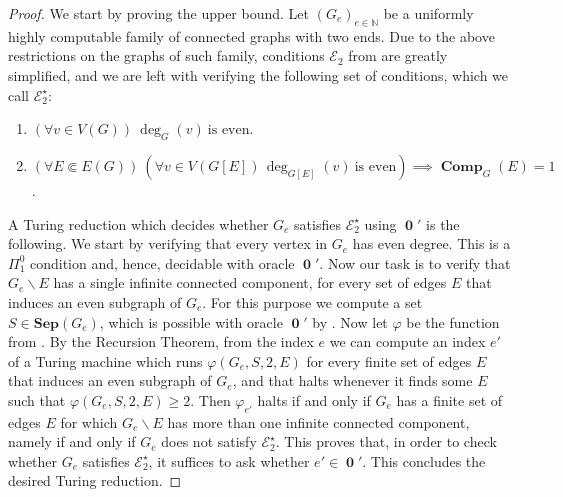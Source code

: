 \documentclass[10pt,A4]{amsart}
\theoremstyle{definition}
\theoremstyle{definition}
\newcommand{\eulertwo}{\mathscr{E} _{2}}
\newcommand{\N}{\mathbb{N}}
\newcommand{\sep}[1]{\mathbf{Sep}({#1})}
\newcommand{\HP}{\operatorname{\mathbf{0}} '}
\newcommand{\comp}{\operatorname{\mathbf{Comp}}}
\begin{document}
\begin{proof}
    We start by proving the upper bound. Let $(G_e)_{e \in \N}$ be a uniformly highly computable family of connected graphs with two ends. Due to the above restrictions on the graphs of such family, conditions $\eulertwo$ from  are greatly simplified, and we are left with verifying the following set of conditions, which we call $\eulertwo^{\star}$:
    \begin{enumerate}
        \item $(\forall v \in V(G)) \ \deg_G(v) \ \text{is even}$.
        \item $(\forall E \Subset E(G)) \ (\forall v \in V(G[E]) \, \deg_{G[E]}(v) \ \text{is even}) \implies \comp_G(E) = 1$.
    \end{enumerate}
     A Turing reduction which decides whether $G_e$ satisfies $\eulertwo^{\star}$ using $\HP$ is the following. We start by verifying that every vertex in $G_e$ has even degree. This is a $\Pi_1^0$ condition and, hence, decidable with oracle $\HP$. Now our task is to verify that $G_e \smallsetminus E$ has a single infinite connected component, for every set of edges $E$ that induces an even subgraph of $G_e$. For this purpose we compute a set $S\in\sep{G_e}$, which is possible with oracle $\HP$ by . Now let $\varphi$ be the function from . By the Recursion Theorem, from the index $e$ we can compute an index $e'$ of a Turing machine which runs $\varphi(G_e,S,2,E)$ for every finite set of edges $E$ that induces an even subgraph of $G_e$, and that halts whenever it finds some $E$ such that $\varphi(G_e,S,2,E)\geq 2$. Then $\varphi_{e'}$ halts if and only if $G_e$ has a finite set of edges $E$ for which $G_e \smallsetminus E$ has more than one infinite connected component, namely if and only if $G_e$ does not satisfy $\eulertwo^{\star}$. This proves that, in order to check whether $G_e$ satisfies $\eulertwo^{\star}$, it suffices to ask whether $e'\in \HP$. This concludes the desired Turing reduction.


\end{proof}
\end{document}
